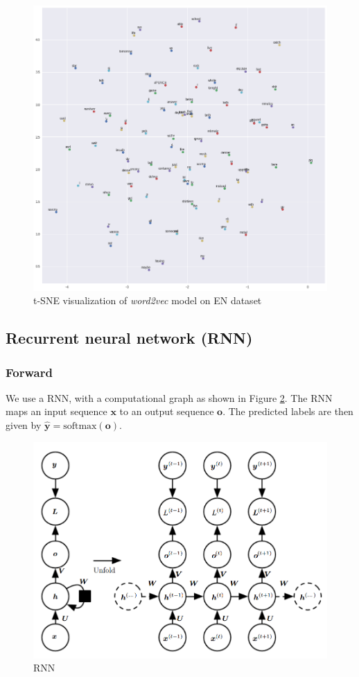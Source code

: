 \documentclass{article}
\begin{document}
\begin{figure}[h]
	\centering
	\includegraphics[width=\linewidth]{assets/word2vec.png}
	\caption{t-SNE visualization of \emph{word2vec} model on EN dataset}
	\label{fig:word2vec}
\end{figure}

\subsection{Recurrent neural network (RNN)}
\subsubsection{Forward}
We use a RNN, with a computational graph as shown in Figure \ref{fig:rnn}. The RNN maps an input sequence $\bm{x}$ to an output sequence $\bm{o}$. The predicted labels are then given by $\hat{\bm{y}} = \text{softmax}(\bm{o})$.

\begin{figure}[h!]
	\centering
	\includegraphics[width=0.7\linewidth]{assets/rnn.png}
	\caption{RNN}
	\label{fig:rnn}
\end{figure}
\end{document}
